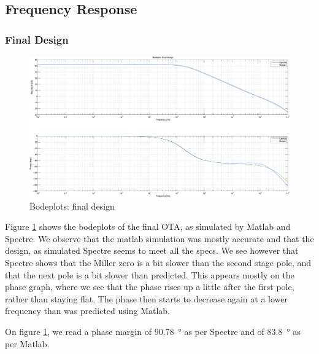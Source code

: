 \documentclass[english,10pt]{article}
\begin{document}
\subsection{Frequency Response}
\subsubsection{Final Design}\label{sec:final}
\begin{figure}[htbp]
  \centering
  \includegraphics[width = \textwidth]{6_1.pdf}
  \caption{Bodeplots: final design\label{fig:final}}
\end{figure}
Figure \ref{fig:final} shows the bodeplots of the final OTA, as simulated by Matlab and Spectre. We observe that the matlab simulation was mostly accurate and that the design, as simulated Spectre seems to meet all the specs. We see however that Spectre shows that the Miller zero is a bit slower than the second stage pole, and that the next pole is a bit slower than predicted. This appears mostly on the phase graph, where we see that the phase rises up a little after the first pole, rather than staying flat. The phase then starts to decrease again at a lower frequency than was predicted using Matlab.

On figure \ref{fig:final}, we read a phase margin of \SI{90.78}{\degree} as per Spectre and of \SI{83.8}{\degree} as per Matlab.
\end{document}
